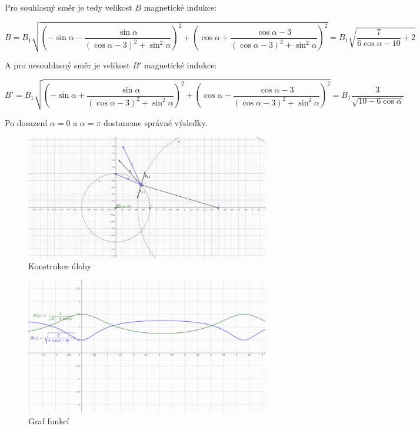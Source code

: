 \documentclass{fkssolpub}
\begin{document}
Pro souhlasný směr je tedy velikost $B$ magnetické indukce:

\[
  B = B_1 \sqrt{\left(- \sin \alpha - \frac{ \sin \alpha}{(\cos \alpha - 3)^2 + \sin^2 \alpha} \right)^2 + \left( \cos \alpha + \frac{\cos \alpha - 3}{(\cos \alpha - 3)^2 + \sin^2 \alpha} \right)^2}
    = B_1 \sqrt{\frac{7}{6 \cos \alpha - 10} + 2}
\]

A pro nesouhlasný směr je velikost $B'$ magnetické indukce:

\[
  B' = B_1 \sqrt{\left(- \sin \alpha + \frac{ \sin \alpha}{(\cos \alpha - 3)^2 + \sin^2 \alpha} \right)^2 + \left( \cos \alpha - \frac{\cos \alpha - 3}{(\cos \alpha - 3)^2 + \sin^2 \alpha} \right)^2}
     = B_1 \frac{3}{\sqrt{10 - 6 \cos \alpha}}
\]

Po dosazení $\alpha = 0$ a $\alpha = \pi$ dostaneme správné výsledky.

\begin{figure}
  \centering
  \includegraphics[width=0.95\textwidth]{2-fig.png}
  \caption{Konstrukce úlohy}
  \label{fig:1}
\end{figure}

\begin{figure}
  \centering
  \includegraphics[width=0.95\textwidth]{2-fig2.png}
  \caption{Graf funkcí}
  \label{fig:2}
\end{figure}
\end{document}
